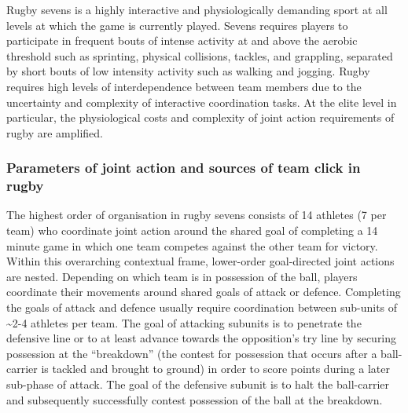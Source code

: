   Rugby sevens is a highly interactive and physiologically demanding sport at all levels at which the game is currently played. Sevens requires players to participate in frequent bouts of intense activity at and above the aerobic threshold such as sprinting, physical collisions, tackles, and grappling, separated by short bouts of low intensity activity such as walking and jogging. Rugby requires high levels of interdependence between team members due to the uncertainty and complexity of interactive coordination tasks.  At the elite level in particular, the physiological costs and complexity of joint action requirements of rugby are amplified.

  \subsubsection{Parameters of joint action and sources of team click in rugby}
  The highest order of organisation in rugby sevens consists of 14 athletes (7 per team) who coordinate joint action around the shared goal of completing a 14 minute game in which one team competes against the other team for victory.  Within this overarching contextual frame, lower-order goal-directed joint actions are nested.  Depending on which team is in possession of the ball, players coordinate their movements around shared goals of attack or defence.  Completing the goals of attack and defence usually require coordination between sub-units of \sim 2-4 athletes per team.  The goal of attacking subunits is to penetrate the defensive line or to at least advance towards the opposition's try line by securing possession at the ``breakdown'' (the contest for possession that occurs after a ball-carrier is tackled and brought to ground) in order to score points during a later sub-phase of attack.  The goal of the defensive subunit is to halt the ball-carrier and subsequently successfully contest possession of the ball at the breakdown.

